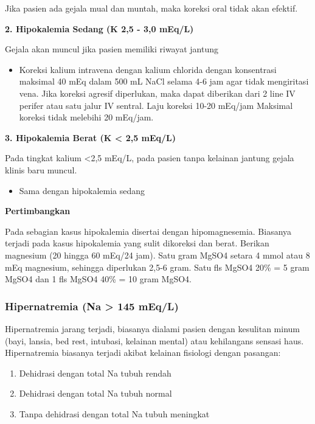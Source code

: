 \documentclass[
]{book}
\providecommand{\tightlist}{%
  \setlength{\itemsep}{0pt}\setlength{\parskip}{0pt}}
\begin{document}
Jika pasien ada gejala mual dan muntah, maka koreksi oral tidak akan efektif.

\textbf{2. Hipokalemia Sedang (K 2,5 - 3,0 mEq/L)}

Gejala akan muncul jika pasien memiliki riwayat jantung

\begin{itemize}
\tightlist
\item
  Koreksi kalium intravena dengan kalium chlorida dengan konsentrasi maksimal 40 mEq dalam 500 mL NaCl selama 4-6 jam agar tidak mengiritasi vena. Jika koreksi agresif diperlukan, maka dapat diberikan dari 2 line IV perifer atau satu jalur IV sentral. Laju koreksi 10-20 mEq/jam Maksimal koreksi tidak melebihi 20 mEq/jam.
\end{itemize}

\textbf{3. Hipokalemia Berat (K \textless{} 2,5 mEq/L)}

Pada tingkat kalium \textless2,5 mEq/L, pada pasien tanpa kelainan jantung gejala klinis baru muncul.

\begin{itemize}
\tightlist
\item
  Sama dengan hipokalemia sedang
\end{itemize}

\textbf{Pertimbangkan}

Pada sebagian kasus hipokalemia disertai dengan hipomagnesemia. Biasanya terjadi pada kasus hipokalemia yang sulit dikoreksi dan berat. Berikan magnesium (20 hingga 60 mEq/24 jam). Satu gram MgSO4 setara 4 mmol atau 8 mEq magnesium, sehingga diperlukan 2,5-6 gram. Satu fls MgSO4 20\% = 5 gram MgSO4 dan 1 fls MgSO4 40\% = 10 gram MgSO4.

\hypertarget{hipernatremia-na-145-meql}{%
\subsubsection{Hipernatremia (Na \textgreater{} 145 mEq/L)}\label{hipernatremia-na-145-meql}}

Hipernatremia jarang terjadi, biasanya dialami pasien dengan kesulitan minum (bayi, lansia, bed rest, intubasi, kelainan mental) atau kehilangans sensasi haus. Hipernatremia biasanya terjadi akibat kelainan fisiologi dengan pasangan:

\begin{enumerate}
\def\labelenumi{\arabic{enumi}.}
\tightlist
\item
  Dehidrasi dengan total Na tubuh rendah
\item
  Dehidrasi dengan total Na tubuh normal
\item
  Tanpa dehidrasi dengan total Na tubuh meningkat
\end{enumerate}
\end{document}
